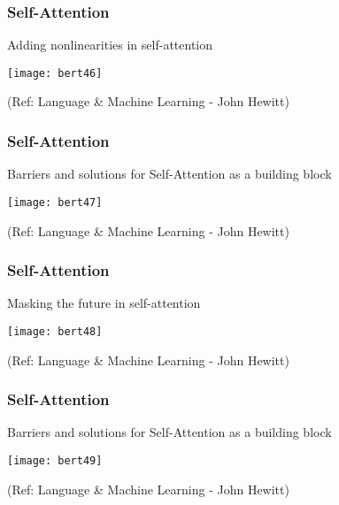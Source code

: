 \begin{frame}[fragile]\frametitle{Self-Attention}

Adding nonlinearities in self-attention

\begin{center}
\texttt{[image: bert46]}
\end{center}	

 
{\tiny (Ref: Language \& Machine Learning - John Hewitt)}
\end{frame}

\begin{frame}[fragile]\frametitle{Self-Attention}

Barriers and solutions for Self-Attention as a building block

\begin{center}
\texttt{[image: bert47]}
\end{center}	

 
{\tiny (Ref: Language \& Machine Learning - John Hewitt)}
\end{frame}


\begin{frame}[fragile]\frametitle{Self-Attention}

Masking the future in self-attention

\begin{center}
\texttt{[image: bert48]}
\end{center}	

 
{\tiny (Ref: Language \& Machine Learning - John Hewitt)}
\end{frame}

\begin{frame}[fragile]\frametitle{Self-Attention}

Barriers and solutions for Self-Attention as a building block

\begin{center}
\texttt{[image: bert49]}
\end{center}	

 
{\tiny (Ref: Language \& Machine Learning - John Hewitt)}
\end{frame}

